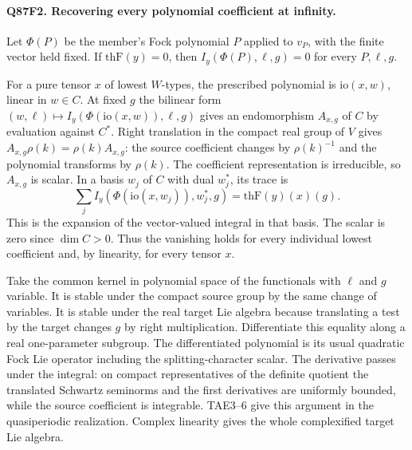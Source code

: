 \paragraph{Q87F2. Recovering every polynomial coefficient at infinity.}
Let $\Phi(P)$ be the member's Fock polynomial $P$ applied to $v_P$,
with the finite vector held fixed. If $\mathrm{thF}(y)=0$, then
$I_y(\Phi(P),\ell,g)=0$ for every $P,\ell,g$.

For a pure tensor $x$ of lowest $W$-types, the prescribed polynomial
is $\mathrm{io}(x,w)$, linear in $w\in C$. At fixed $g$ the bilinear
form $(w,\ell)\mapsto I_y(\Phi(\mathrm{io}(x,w)),\ell,g)$ gives an
endomorphism $A_{x,g}$ of $C$ by evaluation against $C^*$.
Right translation in the compact real group of $V$ gives
$A_{x,g}\rho(k)=\rho(k)A_{x,g}$: the source coefficient changes by
$\rho(k)^{-1}$ and the polynomial transforms by $\rho(k)$.
The coefficient representation is irreducible, so $A_{x,g}$ is
scalar. In a basis $w_j$ of $C$ with dual $w_j^*$, its trace is
\[
 \sum_j I_y(\Phi(\mathrm{io}(x,w_j)),w_j^*,g)
                     = \mathrm{thF}(y)(x)(g).
\]
This is the expansion of the vector-valued integral in that basis.
The scalar is zero since $\dim C>0$. Thus the vanishing holds for
every individual lowest coefficient and, by linearity, for every
tensor $x$.

Take the common kernel in polynomial space of the functionals with
$\ell$ and $g$ variable. It is stable under the compact source group
by the same change of variables. It is stable under the real target
Lie algebra because translating a test by the target changes $g$ by
right multiplication. Differentiate this equality along a real
one-parameter subgroup. The differentiated polynomial is its usual
quadratic Fock Lie operator including the splitting-character scalar.
The derivative passes under the integral: on compact representatives
of the definite quotient the translated Schwartz seminorms and the
first derivatives are uniformly bounded, while the source
coefficient is integrable. TAE3--6 give this argument in the
quasiperiodic realization. Complex linearity gives the whole
complexified target Lie algebra.

